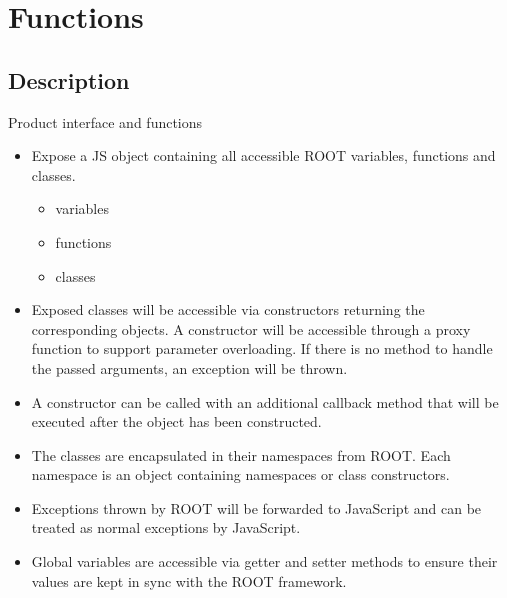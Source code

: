 \section{Functions}
\subsection{Description}

\begin{frame}{Product interface and functions}
\begin{itemize}
  \item Expose a JS object containing all accessible ROOT variables, functions and classes.\\
    \begin{itemize}
      \item variables
      \item functions
      \item classes
    \end{itemize}
  \item Exposed classes will be accessible via constructors returning the corresponding objects. A constructor will be accessible through a proxy function to support parameter overloading. If there is no method to handle the passed arguments, an exception will be thrown.\\
  \item A constructor can be called with an additional callback method that will be executed after the object has been constructed.\\
  \item The classes are encapsulated in their namespaces from ROOT. Each namespace is an object containing namespaces or class constructors.\\
  \item Exceptions thrown by ROOT will be forwarded to JavaScript and can be treated as normal exceptions by JavaScript.\\
  \item Global variables are accessible via getter and setter methods to ensure their values are kept in sync with the ROOT framework.\\
\end{itemize}
\end{frame}
